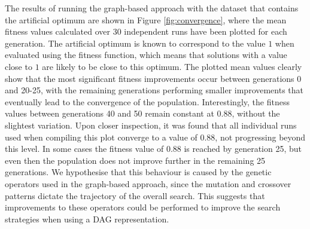 The results of running the graph-based approach with the dataset that contains the artificial optimum are shown in Figure \ref{fig:convergence}, where the mean fitness values calculated over 30 independent runs have been plotted for each generation. The artificial optimum is known to correspond to the value $1$ when evaluated using the fitness function, which means that solutions with a value close to $1$ are likely to be close to this optimum. The plotted mean values clearly show that the most significant fitness improvements occur between generations 0 and  20-25, with the remaining generations performing smaller improvements that eventually lead to the convergence of the population. Interestingly, the fitness values between generations 40 and 50 remain constant at $0.88$, without the slightest variation. Upon closer inspection, it was found that all individual runs used when compiling this plot converge to a value of $0.88$, not progressing beyond this level. In some cases the fitness value of $0.88$ is reached by generation 25, but even then the population does not improve further in the remaining 25 generations. We hypothesise that this behaviour is caused by the genetic operators used in the graph-based approach, since the mutation and crossover patterns dictate the trajectory of the overall search. This suggests that improvements to these operators could be performed to improve the search strategies when using a DAG representation.
